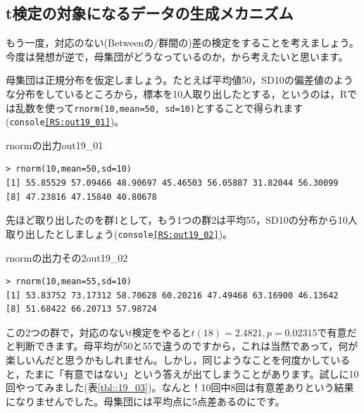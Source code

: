 \documentclass{ltjsarticle}
\begin{document}
\subsection{t検定の対象になるデータの生成メカニズム}
もう一度，対応のない(Betweenの/群間の)差の検定をすることを考えましょう。今度は発想が逆で，母集団がどうなっているのか，から考えたいと思います。

母集団は正規分布を仮定しましょう。たとえば平均値50，SD10の偏差値のような分布をしているところから，標本を10人取り出したとする，というのは，Rでは乱数を使って\texttt{rnorm(10,mean=50, sd=10)}とすることで得られます(\texttt{console\ref{RS:out19_01}})。

\begin{Rscreen}{rnormの出力}{out19_01}
	\begin{verbatim}
> rnorm(10,mean=50,sd=10)
[1] 55.85529 57.09466 48.90697 45.46503 56.05887 31.82044 56.30099 
[8] 47.23816 47.15840 40.80678
\end{verbatim}
\end{Rscreen}

先ほど取り出したのを群1として，もう1つの群2は平均55，SD10の分布から10人取り出したとしましょう(\texttt{console\ref{RS:out19_02}})。

\begin{Rscreen}{rnormの出力その2}{out19_02}
	\begin{verbatim}
> rnorm(10,mean=55,sd=10)
[1] 53.83752 73.17312 58.70628 60.20216 47.49468 63.16900 46.13642 
[8] 51.68422 66.20713 57.98724
\end{verbatim}
\end{Rscreen}

この2つの群で，対応のない$t$検定をやると$t(18)=2.4821,p=0.02315$で有意だと判断できます。母平均が50と55で違うのですから，これは当然であって，何が楽しいんだと思うかもしれません。しかし，同じようなことを何度かしていると，たまに「有意ではない」という答えが出てしまうことがあります。試しに10回やってみました(表\ref{tbl::19_03})。なんと！10回中8回は有意差ありという結果になりませんでした。母集団には平均点に5点差あるのにです。
\end{document}
